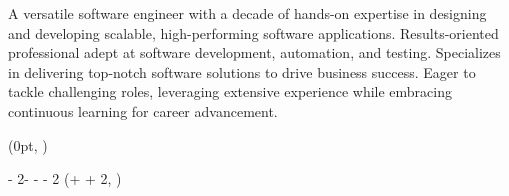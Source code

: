 \documentclass[11pt, a4paper]{resume}
\begin{document}
\makecvheader %

\begin{cvsummary}
    A versatile software engineer with a decade of hands-on expertise in designing and developing scalable, high-performing software applications. Results-oriented professional adept at software development, automation, and testing. Specializes in delivering top-notch software solutions to drive business success. Eager to tackle challenging roles, leveraging extensive experience while embracing continuous learning for career advancement.
\end{cvsummary}



\setlength{\headersmargin}{-0.2cm}
\setlength{\leftcolumnwidth}{5cm}
\setlength{\columnsmargin}{0.5\sidemargin}
\setlength{\timelinemargin}{0.5cm}


\begin{textblock*}{\leftcolumnwidth}(0pt, \headersmargin)
    \vspace{-2mm}
    
    \vspace{3mm}
    
    \vspace{3.5mm}
    
    
\end{textblock*}

\begin{textblock*}
    {\paperwidth - 2\sidemargin - \leftcolumnwidth - \columnsmargin - 2\timelinemargin}
    (\leftcolumnwidth + \columnsmargin + 2\timelinemargin, \headersmargin)
    \vspace{-2mm}
    
\end{textblock*}

\end{document}
